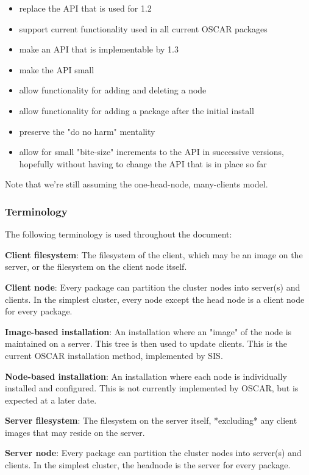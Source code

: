 \begin{itemize}
\item replace the API that is used for 1.2
\item support current functionality used in all current OSCAR packages
\item make an API that is implementable by 1.3
\item make the API small
\item allow functionality for adding and deleting a node
\item allow functionality for adding a package after the initial install
\item preserve the "do no harm" mentality
\item allow for small "bite-size" increments to the API in successive
      versions, hopefully without having to change the API that is in
      place so far
\end{itemize}

Note that we're still assuming the one-head-node, many-clients model.


\subsubsection{Terminology}

The following terminology is used throughout the document:

{\bf Client filesystem}: The filesystem of the client, which may be an image
on the server, or the filesystem on the client node itself.

{\bf Client node}: Every package can partition the cluster nodes into
server(s) and clients.  In the simplest cluster, every node except the
head node is a client node for every package.

{\bf Image-based installation}: An installation where an "image" of the
node is maintained on a server.  This tree is then used to update
clients.  This is the current OSCAR installation method, implemented
by SIS.

{\bf Node-based installation}: An installation where each node is
individually installed and configured.  This is not currently
implemented by OSCAR, but is expected at a later date.

{\bf Server filesystem}: The filesystem on the server itself,
*excluding* any client images that may reside on the server.

{\bf Server node}: Every package can partition the cluster nodes into
server(s) and clients.  In the simplest cluster, the headnode is the
server for every package.


